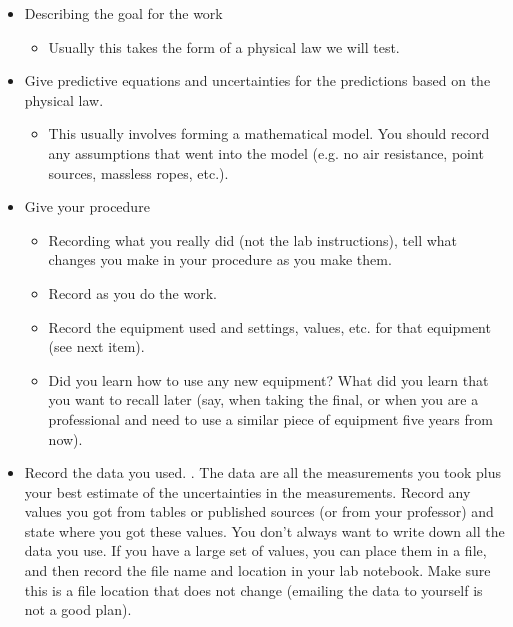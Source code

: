 \begin{itemize}
\item Describing the goal for the work

\begin{itemize}
\item Usually this takes the form of a physical law we will test.
\end{itemize}

\item Give predictive equations and uncertainties for the predictions based on the physical law.

\begin{itemize}
\item This usually involves forming a mathematical model. You should record any assumptions that went into the model (e.g. no air resistance, point sources, massless ropes, etc.).
\end{itemize}

\item Give your procedure

\begin{itemize}
\item Recording what you really did (not the lab instructions), tell what
changes you make in your procedure as you make them.

\item Record as you do the work.

\item Record the equipment used and settings, values, etc. for that
equipment (see next item).

\item Did you learn how to use any new equipment? What did you learn that
you want to recall later (say, when taking the final, or when you are a
professional and need to use a similar piece of equipment five years from
now).
\end{itemize}

\item Record the data you used. . The data are all the measurements you took plus your best estimate of the uncertainties in the measurements. Record any values you got from tables or published sources (or from your professor) and state where you got these values. You don't always want to write down all the data you use. If you have a large set of values, you can place them in a file, and then record the file name and location in your lab notebook. Make sure this is a file location that does not change (emailing the data to yourself is not a good plan).


\end{itemize}
